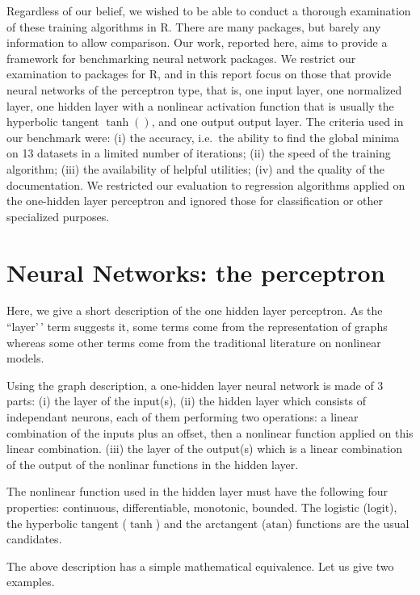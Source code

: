 Regardless of our belief, we wished to be able to conduct a thorough
examination of these training algorithms in R. There are many packages,
but barely any information to allow comparison. Our work, reported here,
aims to provide a framework for benchmarking neural network packages. We
restrict our examination to packages for R, and in this report focus on
those that provide neural networks of the perceptron type, that is, one
input layer, one normalized layer, one hidden layer with a nonlinear
activation function that is usually the hyperbolic tangent \(\tanh()\),
and one output output layer. The criteria used in our benchmark were:
(i) the accuracy, i.e.~the ability to find the global minima on 13
datasets in a limited number of iterations; (ii) the speed of the
training algorithm; (iii) the availability of helpful utilities; (iv)
and the quality of the documentation. We restricted our evaluation to
regression algorithms applied on the one-hidden layer perceptron and
ignored those for classification or other specialized purposes.

\hypertarget{neural-networks-the-perceptron}{%
\section{Neural Networks: the
perceptron}\label{neural-networks-the-perceptron}}

Here, we give a short description of the one hidden layer perceptron. As
the ``layer'\,' term suggests it, some terms come from the
representation of graphs whereas some other terms come from the
traditional literature on nonlinear models.

Using the graph description, a one-hidden layer neural network is made
of 3 parts: (i) the layer of the input(s), (ii) the hidden layer which
consists of independant neurons, each of them performing two operations:
a linear combination of the inputs plus an offset, then a nonlinear
function applied on this linear combination. (iii) the layer of the
output(s) which is a linear combination of the output of the nonlinar
functions in the hidden layer.

The nonlinear function used in the hidden layer must have the following
four properties: continuous, differentiable, monotonic, bounded. The
logistic (\(\text{logit}\)), the hyperbolic tangent (\(\tanh\)) and the
arctangent (\(\text{atan}\)) functions are the usual candidates.

The above description has a simple mathematical equivalence. Let us give
two examples.

